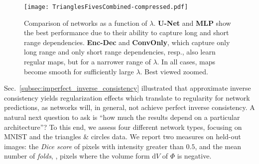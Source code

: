\begin{figure}
  \texttt{[image: TrianglesFivesCombined-compressed.pdf]}

\caption{Comparison of networks as a function of $\lambda$. \textbf{U-Net} and \textbf{MLP} show the best performance due to their ability to capture long and short range dependencies. \textbf{Enc-Dec} and \textbf{ConvOnly}, which capture only long range and only short range dependencies, resp., also learn regular maps, but for a narrower range of $\lambda$. In all cases, maps become smooth for sufficiently large $\lambda$. Best viewed zoomed.} \label{fig:registration_across_architectures}
\vspace{-0.2cm}
\end{figure}

Sec.~\ref{subsec:imperfect_inverse_consistency} illustrated that approximate inverse consistency yields regularization effects which translate to regularity for network predictions, as networks will, in general, not achieve perfect inverse consistency. A natural next question to ask is ``how much the results depend on a particular architecture''? To this end, we assess four different network types, focusing on MNIST and the triangles \& circles data. We report two measures on held-out images: the \emph{Dice score} of pixels with intensity greater than $0.5$, and the mean number of \emph{folds}, \ie, pixels where the volume form $\mathrm{d}V$ of $\Phi$ is negative.



